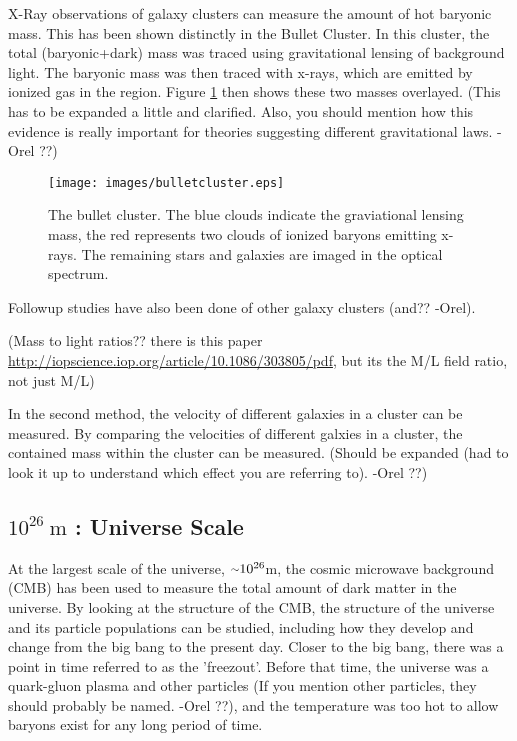     X-Ray observations of galaxy clusters can measure the amount of hot baryonic mass.
    This has been shown distinctly in the Bullet Cluster\cite{bullet_cluster}.
    In this cluster, the total (baryonic+dark) mass was traced using gravitational lensing of background light.
    The baryonic mass was then traced with x-rays, which are emitted by ionized gas in the region.
    Figure \ref{fig:bullet} then shows these two masses overlayed.
    {\color{red}(This has to be expanded a little and clarified. Also, you should mention how this evidence is really important for theories suggesting different gravitational laws. -Orel ??)}

    \begin{figure}[ht]
      \texttt{[image: images/bulletcluster.eps]}
      \caption[The Bullet Cluster]{
        The bullet cluster\cite{bullet_cluster_combined_image}.
        The blue clouds indicate the graviational lensing mass\cite{bullet_cluster}, the red represents two clouds of ionized baryons emitting x-rays\cite{bullet_cluster_chandramap}.
        The remaining stars and galaxies are imaged in the optical spectrum\cite{bullet_cluster_composite}.}
      \label{fig:bullet}
    \end{figure}

    Followup studies have also been done of other galaxy clusters {\color{red}(and?? -Orel)}.

    {\color{red}(Mass to light ratios?? there is this paper \url{http://iopscience.iop.org/article/10.1086/303805/pdf}, but its the M/L field ratio, not just M/L)}

    In the second method, the velocity of different galaxies in a cluster can be measured.
    By comparing the velocities of different galxies in a cluster, the contained mass within the cluster can be measured.
    {\color{red}(Should be expanded (had to look it up to understand which effect you are referring to). -Orel ??)}

  \subsection{$10^{26}\:\text{m}$ : Universe Scale}
    At the largest scale of the universe, $\nicetilde 10^{26}$m, the cosmic microwave background (CMB) has been used to measure the total amount of dark matter in the universe.
    By looking at the structure of the CMB, the structure of the universe and its particle populations can be studied, including how they develop and change from the big bang to the present day.
    Closer to the big bang, there was a point in time referred to as the 'freezout'.
    Before that time, the universe was a quark-gluon plasma {\color{red}and other particles (If you mention other particles, they should probably be named. -Orel ??)}, and the temperature was too hot to allow baryons exist for any long period of time.

